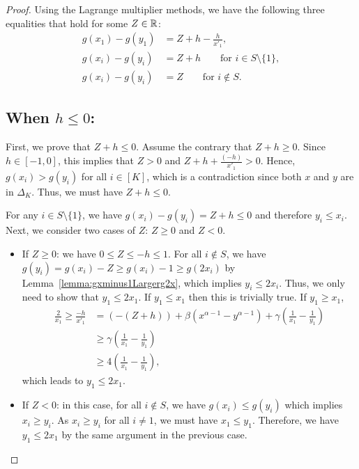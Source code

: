 \begin{proof}
    Using the Lagrange multiplier methods, we have the following three equalities that hold for some $Z \in \mathbb{R}$:
    \begin{align}
        g(x_1) - g(y_1) &= Z + h - \frac{h}{x'_1}, \\
        g(x_i) - g(y_i) &= Z + h \qquad\text{for } i \in S \setminus \{1\}, \\
        g(x_i) - g(y_i) &= Z \qquad\text{for } i \notin S.
    \end{align}
    \subsection*{When $h \leq 0$:}
    First, we prove that $Z + h \leq 0$. Assume the contrary that $Z + h \geq 0$. Since $h \in [-1, 0]$, this implies that $Z > 0$ and $Z + h + \frac{(-h)}{x'_1} > 0$. Hence, $g(x_i) > g(y_i)$ for all $i \in [K]$, which is a contradiction since both $x$ and $y$ are in $\Delta_K$. Thus, we must have $Z + h \leq 0$.

    For any $i \in S \setminus \{1\}$, we have $g(x_i) - g(y_i) = Z + h \leq 0$ and therefore $y_i \leq x_i$. 
    Next, we consider two cases of $Z$: $Z \geq 0$ and $Z < 0$.
    \begin{itemize}
        \item If $Z \geq 0$: we have $0 \leq Z \leq -h \leq 1$. For all $i \notin S$, we have $g(y_i) = g(x_i) - Z \geq g(x_i) - 1 \geq g(2x_i)$ by Lemma~\ref{lemma:gxminus1Largerg2x}, which implies $y_i \leq 2x_i$. Thus, we only need to show that $y_1 \leq 2x_1$. If $y_1 \leq x_1$ then this is trivially true. If $y_1 \geq x_1$,
        \begin{align*}
            \frac{2}{x_1} \geq \frac{-h}{x'_1} &= (-(Z+h)) + \beta(x^{\alpha-1} - y^{\alpha-1}) + \gamma\left(\frac{1}{x_1} - \frac{1}{y_1}\right) \\
            &\geq \gamma\left(\frac{1}{x_1} - \frac{1}{y_1}\right) \\
            &\geq 4\left(\frac{1}{x_1} - \frac{1}{y_1}\right),
        \end{align*}
        which leads to $y_1 \leq 2x_1$. 
        \item If $Z < 0$: in this case, for all $i \notin S$, we have $g(x_i) \leq g(y_i)$ which implies $x_i \geq y_i$.  As $x_i \geq y_i$ for all $i \neq 1$, we must have $x_1 \leq y_1$. Therefore, 
        we have $y_1 \leq 2x_1$ by the same argument in the previous case.
    \end{itemize}


\end{proof}
